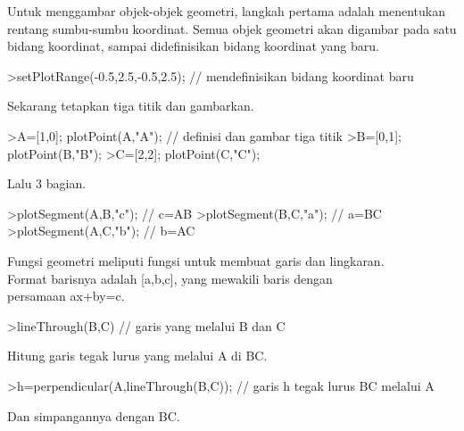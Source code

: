 \documentclass{article}
\begin{document}
\begin{eulernotebook}
\begin{eulercomment}
\begin{eulercomment}
\begin{eulercomment}
\end{eulercomment}
\begin{eulercomment}
Untuk menggambar objek-objek geometri, langkah pertama adalah menentukan rentang sumbu-sumbu
koordinat. Semua objek geometri akan digambar pada satu bidang koordinat, sampai didefinisikan
bidang koordinat yang baru.
\end{eulercomment}
\begin{eulerprompt}
>setPlotRange(-0.5,2.5,-0.5,2.5); // mendefinisikan bidang koordinat baru 
\end{eulerprompt}
\begin{eulercomment}
Sekarang tetapkan tiga titik dan gambarkan.
\end{eulercomment}
\begin{eulerprompt}
>A=[1,0]; plotPoint(A,"A"); // definisi dan gambar tiga titik
>B=[0,1]; plotPoint(B,"B");
>C=[2,2]; plotPoint(C,"C");
\end{eulerprompt}
\begin{eulercomment}
Lalu 3 bagian.
\end{eulercomment}
\begin{eulerprompt}
>plotSegment(A,B,"c"); // c=AB
>plotSegment(B,C,"a"); // a=BC
>plotSegment(A,C,"b"); // b=AC
\end{eulerprompt}
\begin{eulercomment}
Fungsi geometri meliputi fungsi untuk membuat garis dan lingkaran.\\
Format barisnya adalah [a,b,c], yang mewakili baris dengan\\
persamaan ax+by=c.
\end{eulercomment}
\begin{eulerprompt}
>lineThrough(B,C) // garis yang melalui B dan C
\end{eulerprompt}
\begin{euleroutput}
  [-1,  2,  2]
\end{euleroutput}
\begin{eulercomment}
Hitung garis tegak lurus yang melalui A di BC.
\end{eulercomment}
\begin{eulerprompt}
>h=perpendicular(A,lineThrough(B,C)); // garis h tegak lurus BC melalui A
\end{eulerprompt}
\begin{eulercomment}
Dan simpangannya dengan BC.
\end{eulercomment}
\begin{eulerprompt}

\end{eulerprompt}
\end{eulercomment}
\end{eulercomment}
\end{eulernotebook}
\end{document}

